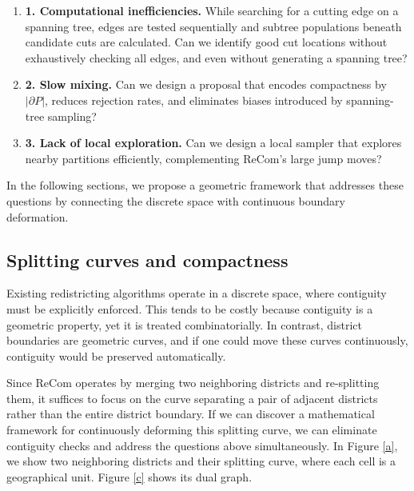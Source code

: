 \documentclass[11pt]{article}
\begin{document}
\begin{enumerate}    
\item[]\textbf{1. Computational inefficiencies.} While searching for a cutting edge on a spanning tree, edges are tested sequentially and subtree populations beneath candidate cuts are calculated. Can we identify good cut locations without exhaustively checking all edges, and even without generating a spanning tree?

\item[]\textbf{2. Slow mixing.} Can we design a proposal that encodes compactness by $|\partial P|$, reduces rejection rates, and eliminates biases introduced by spanning-tree sampling?

\item[]\textbf{3. Lack of local exploration.} Can we design a local sampler that explores nearby partitions efficiently, complementing ReCom’s large jump moves?
\end{enumerate}

In the following sections, we propose a geometric framework that addresses these questions by connecting the discrete space with continuous boundary deformation.



\subsection{Splitting curves and compactness}\label{sec:curve}

Existing redistricting algorithms operate in a discrete space, where contiguity must be explicitly enforced. This tends to be costly because contiguity is a geometric property, yet it is treated combinatorially. In contrast, district boundaries are geometric curves, and if one could move these curves continuously, contiguity would be preserved automatically.

Since ReCom operates by merging two neighboring districts and re-splitting them, it suffices to focus on the curve separating a pair of adjacent districts rather than the entire district boundary. If we can discover a mathematical framework for continuously deforming this splitting curve, we can eliminate contiguity checks and address the questions above simultaneously. In Figure \ref{a}, we show two neighboring districts and their splitting curve, where each cell is a geographical unit. Figure \ref{c} shows its dual graph.
\end{document}
